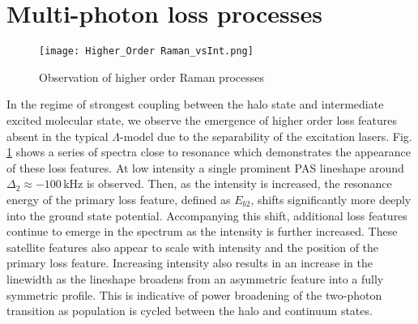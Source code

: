 %

\section{Multi-photon loss processes} \label{sec:highE_coupling}
	\begin{figure} 
	\centerline{
	  \texttt{[image: Higher\_Order Raman\_vsInt.png]}}
	  \caption{Observation of higher order Raman processes}{}
	  \label{fig:highIntMultiPhoton}
	\end{figure}
In the regime of strongest coupling between the halo state and intermediate excited molecular state, we observe the emergence of higher order loss features absent in the typical $\Lambda$-model due to the separability of the excitation lasers. %
Fig.\,\ref{fig:highIntMultiPhoton} shows a series of spectra close to resonance which demonstrates the appearance of these loss features.
At low intensity a single prominent PAS lineshape around $\Delta_2 \approx -100$\,kHz is observed.
Then, as the intensity is increased, the resonance energy of the primary loss feature, defined as $E_{b2}$, shifts significantly more deeply into the ground state potential.
Accompanying this shift, additional loss features continue to emerge in the spectrum as the intensity is further increased. These satellite features also appear to scale with intensity and the position of the primary loss feature.
Increasing intensity also results in an increase in the linewidth as the lineshape broadens from an asymmetric feature into a fully symmetric profile.
This is indicative of power broadening of the two-photon transition as population is cycled between the halo and continuum states.

